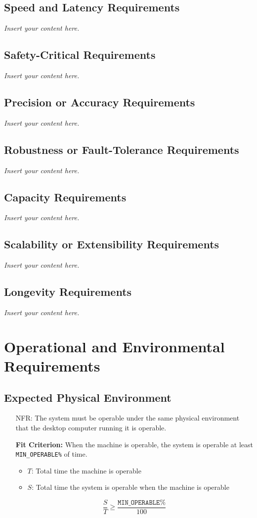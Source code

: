 \documentclass[12pt]{article}
\newcommand{\lips}{\textit{Insert your content here.}}
\newcounter{nfrnum} %
\newcommand{\rthenfrnum}{NFR\refstepcounter{nfrnum}\thenfrnum:}
\begin{document}
\subsection{Speed and Latency Requirements}
\lips
\subsection{Safety-Critical Requirements}
\lips
\subsection{Precision or Accuracy Requirements}
\lips
\subsection{Robustness or Fault-Tolerance Requirements}
\lips
\subsection{Capacity Requirements}
\lips
\subsection{Scalability or Extensibility Requirements}
\lips
\subsection{Longevity Requirements}
\lips

\section{Operational and Environmental Requirements}
\subsection{Expected Physical Environment}
\begin{itemize}
\item[\rthenfrnum]
The system must be operable under the same physical environment that the desktop computer running it is operable.

\textbf{Fit Criterion:} When the machine is operable, the system is operable at least \texttt{MIN\_OPERABLE\%} of time.
\begin{itemize}
    \item \( T \): Total time the machine is operable
    \item \( S \): Total time the system is operable when the machine is operable
\end{itemize}
\[
    \frac{S}{T} \geq \frac{\texttt{MIN\_OPERABLE\%}}{100}
\]
\end{itemize}
\end{document}
